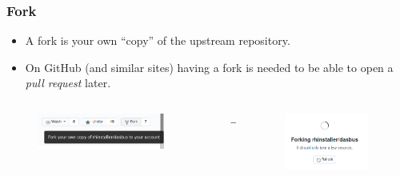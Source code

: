 \documentclass[aspectratio=169]{beamer}              %
\begin{document}
\begin{frame}
	\frametitle{Fork}
	
	\begin{block}{}
		\begin{itemize}
			\item A fork is your own ``copy'' of the upstream repository.
			\item On GitHub (and similar sites) having a fork is needed to be able to open a \emph{pull request} later.
		\end{itemize}
	\end{block}
	
	\begin{columns}
\begin{column}{0.30\textwidth}
	\begin{figure}[ht!]
	\begin{center}
  	  \includegraphics[width=0.9\textwidth]{img/gh-fork-3.png}
	\end{center}
	\end{figure}
\end{column}

\begin{column}{0.03\textwidth}
\begin{center}
$\rightarrow$
\end{center}
\end{column}

\begin{column}{0.30\textwidth}
\begin{figure}[ht!]
	\begin{center}
  	  \includegraphics[width=0.9\textwidth]{img/gh-fork-1.png}
	\end{center}
\end{figure}
\end{column}


\end{columns}
\end{frame}
\end{document}
